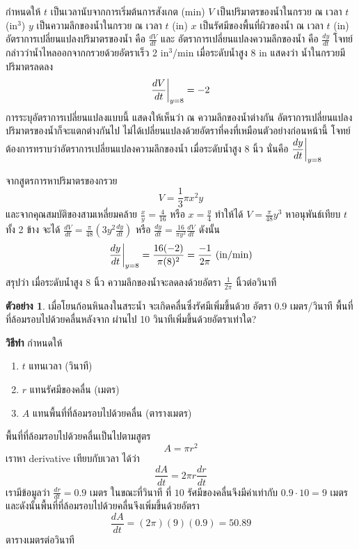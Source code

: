 \documentclass[
]{book}
\theoremstyle{definition}
\theoremstyle{definition}
\newtheorem{example}{ตัวอย่าง}[chapter]
\theoremstyle{definition}
\theoremstyle{definition}
\theoremstyle{remark}
\begin{document}
กำหนดให้ \(t\) เป็นเวลานับจากการเริ่มต้นการสังเกต (min) \(V\) เป็นปริมาตรของน้ำในกรวย
ณ เวลา \(t\) (in\(^3\)) \(y\) เป็นความลึกของน้ำในกรวย ณ เวลา \(t\) (in) \(x\)
เป็นรัศมีของพื้นที่ผิวของน้ำ ณ เวลา \(t\) (in) อัตราการเปลี่ยนแปลงปริมาตรของน้ำ คือ
\(\displaystyle \frac{dV}{dt}\) และ อัตราการเปลี่ยนแปลงความลึกของน้ำ คือ
\(\displaystyle  \frac{dy}{dt}\) โจทย์กล่าวว่าน้ำไหลออกจากกรวยด้วยอัตราเร็ว 2
in\(^3\)/min เมื่อระดับน้ำสูง 8 in แสดงว่า น้ำในกรวยมีปริมาตรลดลง
\[\frac{dV}{dt}\bigg{|}_{y=8} = -2\] การระบุอัตราการเปลี่ยนแปลงแบบนี้
แสดงให้เห็นว่า ณ ความลึกของน้ำต่างกัน อัตราการเปลี่ยนแปลงปริมาตรของน้ำก็จะแตกต่างกันไป
ไม่ได้เปลี่ยนแปลงด้วยอัตราที่คงที่เหมือนตัวอย่างก่อนหน้านี้
โจทย์ต้องการทราบว่าอัตราการเปลี่ยนแปลงความลึกของน้ำ เมื่อระดับน้ำสูง 8 นิ้ว นั่นคือ
\(\displaystyle  \frac{dy}{dt}\bigg{|}_{y=8}\)

จากสูตรการหาปริมาตรของกรวย \[V=\frac{1}{3}\pi x^2 y\]
และจากคุณสมบัติของสามเหลี่ยมคล้าย \(\displaystyle \frac{x}{y}=\frac{4}{16}\) หรือ
\(\displaystyle x=\frac{y}{4}\) ทำให้ได้
\(\displaystyle V=\frac{\pi}{48} y^3\) หาอนุพันธ์เทียบ \(t\) ทั้ง 2 ข้าง จะได้
\(\displaystyle \frac{dV}{dt}=\frac{\pi}{48} (3y^2 \frac{dy}{dt})\) หรือ
\(\displaystyle \frac{dy}{dt}=\frac{16}{\pi y^2} \frac{dV}{dt}\) ดังนั้น
\[\displaystyle \frac{dy}{dt}\bigg{|}_{y=8} = \frac{16(-2)}{\pi(8)^2} = \frac{-1}{2\pi} \text{ (in/min)}\]
สรุปว่า เมื่อระดับน้ำสูง 8 นิ้ว ความลึกของน้ำจะลดลงด้วยอัตรา
\(\displaystyle \frac{1}{2\pi}\) นิ้วต่อวินาที

\begin{example}
เมื่อโยนก้อนหินลงในสระน้ำ จะเกิดคลื่นซึ่งรัศมีเพิ่มขึ้นด้วย อัตรา 0.9 เมตร/วินาที
พื้นที่ที่ล้อมรอบไปด้วยคลื่นหลังจาก ผ่านไป 10 วินาทีเพิ่มขึ้นด้วยอัตราเท่าใด?
\end{example}

\textbf{วิธีทำ} กำหนดให้

\begin{enumerate}
\def\labelenumi{\arabic{enumi}.}
\item
  \(t\) แทนเวลา (วินาที)
\item
  \(r\) แทนรัศมีของคลื่น (เมตร)
\item
  \(A\) แทนพื้นที่ที่ล้อมรอบไปด้วยคลื่น (ตารางเมตร)
\end{enumerate}

พื้นที่ที่ล้อมรอบไปด้วยคลื่นเป็นไปตามสูตร \[A = \pi r^2\] เราหา derivative
เทียบกับเวลา ได้ว่า \[\frac{dA}{dt} = 2\pi r\frac{dr}{dt}\] เรามีข้อมูลว่า
\(\frac{dr}{dt} = 0.9\) เมตร ในขณะที่วินาที ที่ \(10\) รัศมีของคลื่นจึงมีค่าเท่ากับ
\(0.9\cdot 10 = 9\) เมตร และดังนั้นพื้นที่ที่ล้อมรอบไปด้วยคลื่นจึงเพิ่มขึ้นด้วยอัตรา
\[\frac{dA}{dt} = (2\pi)(9)(0.9) = 50.89\] ตารางเมตรต่อวินาที
\end{document}
